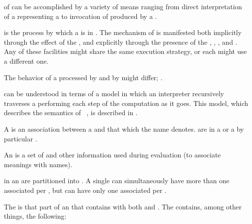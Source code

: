 
 of  can be accomplished by a variety of means ranging
from direct interpretation of a  representing a 
to invocation of  produced by a .
 
 is the process by which a  is  in \clisp.
The mechanism of  is manifested
 both implicitly through the effect of the ,
 and  explicitly through the presence of the  
       ,
       ,
       ,
   and .
Any of these facilities might share the same execution strategy, 
or each might use a different one.

The behavior of a  processed by 
and by  might differ; \seesection\SemanticConstraints.

 can be understood in terms of a model in which an
interpreter recursively traverses a  performing each
step of the computation as it goes.  
This model, which describes the semantics of \clisp\ ,
is described in \secref\EvaluationModel.


A  is an association between a  and
that which the name denotes.   are 
in a  or a 
by particular .

An  is a set of  and other information
used during evaluation (\eg to associate meanings with names).

 in an  are partitioned into .
A single  can simultaneously have more than one
associated  per ,
but can have only one associated  per .



The  is that part of an 
that contains  with both  
and .
The  contains, among other things, the following:

